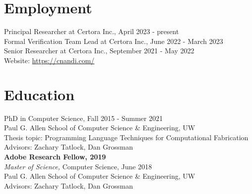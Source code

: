\documentclass[margin, 10pt]{res} %
\begin{document}
\begin{resume}


\section{Employment}

Principal Researcher at Certora Inc., April 2023 - present \\
Formal Verification Team Lead at Certora Inc., June 2022 - March 2023 \\
Senior Researcher at Certora Inc., September 2021 - May 2022 \\
  Website: \url{https://cnandi.com/} \\

\section{Education}

PhD in Computer Science, Fall 2015 - Summer 2021 \\
Paul G. Allen School of Computer Science \& Engineering, UW \\
Thesis topic: Programming Language Techniques for Computational Fabrication \\
Advisors: Zachary Tatlock, Dan Grossman\\
\textbf{Adobe Research Fellow, 2019} \\

{\sl Master of Science,} Computer Science, June 2018 \\
Paul G. Allen School of Computer Science \& Engineering, UW \\
Advisors: Zachary Tatlock, Dan Grossman


\end{resume}
\end{document}
